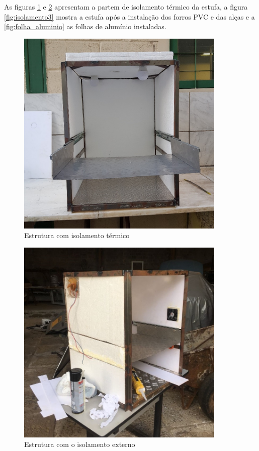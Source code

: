 As figuras \ref{fig:isolamento1} e \ref{fig:isolamento2} apresentam a partem de isolamento térmico da estufa, a figura \ref{fig:isolamento3} mostra a estufa após a instalação dos forros PVC e das alças e a \ref{fig:folha_aluminio} as folhas de alumínio instaladas.
\begin{figure}[!htb]
	\centering
	\includegraphics[width=10cm]{figuras/isolamento1.png}
	\caption{Estrutura com isolamento térmico}
	\label{fig:isolamento1}
\end{figure}
\begin{figure}[!htb]
	\centering
	\includegraphics[width=10cm]{figuras/isolamento2.png}
	\caption{Estrutura com o isolamento externo}
	\label{fig:isolamento2}
\end{figure}
